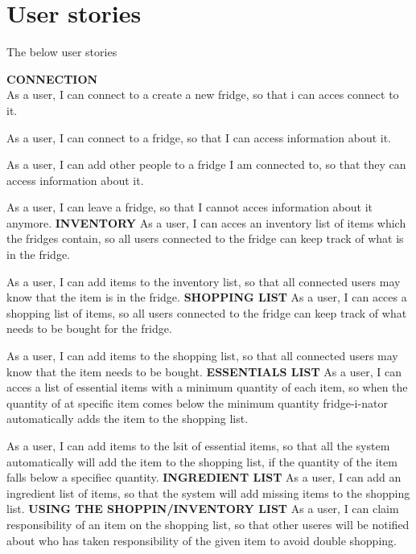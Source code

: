 \documentclass[12pt]{article}
\begin{document}
\section{User stories}
The below user stories 

\textbf{CONNECTION}\\
As a user, I can connect to a create a new fridge, so that i can acces connect to it.

As a user, I can connect to a fridge, so that I can access information about it.

As a user, I can add other people to a fridge I am connected to, so that they can access information about it.

As a user, I can leave a fridge, so that I cannot acces information about it anymore.
\newline
\newline
\textbf{INVENTORY}
As a user, I can acces an inventory list of items which the fridges contain, so all users connected to the fridge can keep track of what is in the fridge.

As a user, I can add items to the inventory list, so that all connected users may know that the item is in the fridge.
\newline
\newline
\textbf{SHOPPING LIST}
As a user, I can acces a shopping list of items, so all users connected to the fridge can keep track of what needs to be bought for the fridge.

As a user, I can add items to the shopping list, so that all connected users may know that the item needs to be bought.
\newline
\newline
\textbf{ESSENTIALS LIST}
As a user, I can acces a list of essential items with a minimum quantity of each item, so when the quantity of at specific item comes below the minimum quantity fridge-i-nator automatically adds the item to the shopping list.

As a user, I can add items to the lsit of essential items, so that all the system automatically will add the item to the shopping list, if the quantity of the item falls below a specifiec quantity.
\newline
\newline
\textbf{INGREDIENT LIST}
As a user, I can add an ingredient list of items, so that the system will add missing items to the shopping list.
\newline
\newline
\textbf{USING THE SHOPPIN/INVENTORY LIST}
As a user, I can claim responsibility of an item on the shopping list, so that other useres will be notified about who has taken responsibility of the given item to avoid double shopping.
\end{document}
